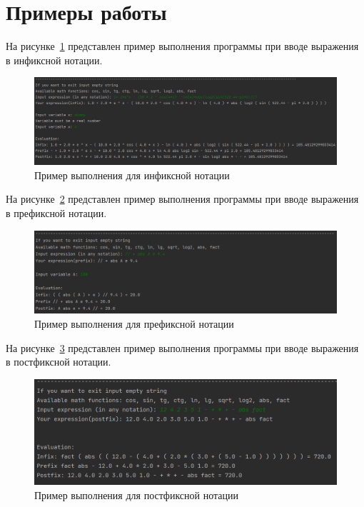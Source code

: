 \section*{Примеры работы}

На рисунке~\ref{fig:ex_infix} представлен
пример выполнения программы при вводе
выражения в инфиксной нотации.

\begin{figure}[H]
    \centering
    \includegraphics[width=\linewidth]{photo/ex_infix}
    \caption{Пример выполнения для инфиксной нотации}
    \label{fig:ex_infix}
\end{figure}

На рисунке~\ref{fig:ex_prefix} представлен
пример выполнения программы при вводе
выражения в префиксной нотации.

\begin{figure}[H]
    \centering
    \includegraphics[width=\linewidth]{photo/ex_prefix}
    \caption{Пример выполнения для префиксной нотации}
    \label{fig:ex_prefix}
\end{figure}

На рисунке~\ref{fig:ex_postfix} представлен
пример выполнения программы при вводе
выражения в постфиксной нотации.

\begin{figure}[H]
    \centering
    \includegraphics[width=\linewidth]{photo/ex_postfix}
    \caption{Пример выполнения для постфиксной нотации}
    \label{fig:ex_postfix}
\end{figure}

